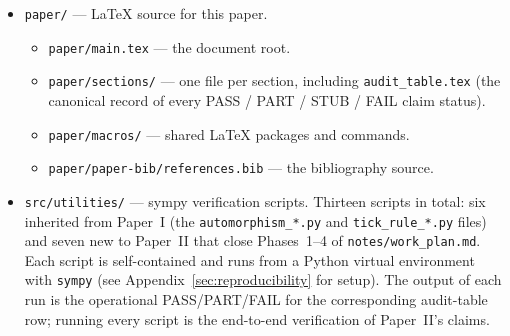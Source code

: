\begin{itemize}
\item \nolinkurl{paper/} --- LaTeX source for this paper.
  \begin{itemize}
  \item \nolinkurl{paper/main.tex} --- the document root.
  \item \nolinkurl{paper/sections/} --- one file per section,
    including \nolinkurl{audit_table.tex} (the canonical
    record of every PASS / PART / STUB / FAIL claim status).
  \item \nolinkurl{paper/macros/} --- shared LaTeX packages and
    commands.
  \item \nolinkurl{paper/paper-bib/references.bib} --- the
    bibliography source.
  \end{itemize}

\item \nolinkurl{src/utilities/} --- sympy verification scripts.
  Thirteen scripts in total: six inherited from Paper~I (the
  \nolinkurl{automorphism_*.py} and \nolinkurl{tick_rule_*.py}
  files) and seven new to Paper~II that close Phases~1--4 of
  \nolinkurl{notes/work_plan.md}.  Each script is self-contained
  and runs from a Python virtual environment with \texttt{sympy}
  (see Appendix~\ref{sec:reproducibility} for setup).  The output
  of each run is the operational PASS/PART/FAIL for the
  corresponding audit-table row; running every script is the
  end-to-end verification of Paper~II's claims.


\end{itemize}
